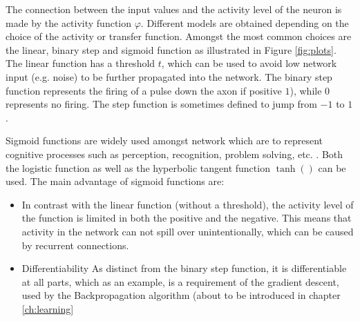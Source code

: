 \documentclass[10pt,a4paper,DIV=11]{scrreprt}
\begin{document}
The connection between the input values and the activity level of the neuron is made by the activity function $\varphi$. Different models are obtained depending on the choice of the activity or transfer function. Amongst the most common choices are the linear, binary step and sigmoid function as illustrated in Figure \ref{fig:plots}. The linear function has a threshold $t$, which can be used to avoid low network input (e.g. noise) to be further propagated into the network. The binary step function represents the firing of a pulse down the axon if positive $1$), while $0$ represents no firing. The step function is sometimes defined to jump from $-1$ to $1$. 

Sigmoid functions are widely used amongst network which are to represent cognitive processes such as perception, recognition, problem solving, etc. .
Both the logistic function as well as the hyperbolic tangent function $\tanh()$ can be used. The main advantage of sigmoid functions are:

\begin{itemize}
\item In contrast with the linear function (without a threshold), the activity level of the function is limited in both the positive and the negative. This means that activity in the network can not spill over unintentionally, which can be caused by recurrent connections.
\item Differentiability
As distinct from the binary step function, it is differentiable at all parts, which as an example, is a requirement of the gradient descent, used by the Backpropagation algorithm (about to be introduced in chapter \ref{ch:learning}
\end{itemize}
\end{document}
